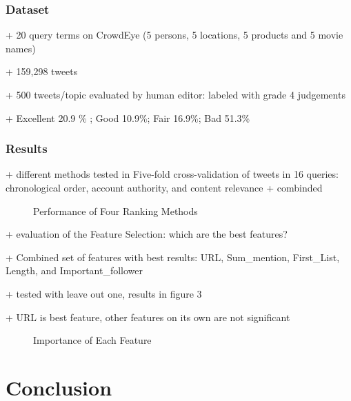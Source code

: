 \documentclass{proseminar}
\begin{document}
\subsubsection*{Dataset}
+ 20 query terms on CrowdEye (5 persons, 5 locations, 5 products and 5 movie names)

+ 159,298 tweets

+ 500 tweets/topic evaluated by human editor: labeled with grade 4 judgements 

+ Excellent 20.9 \% ; Good 10.9\%; Fair 16.9\%; Bad 51.3\% 

\subsubsection*{Results}
+ different methods tested in Five-fold cross-validation of tweets in 16 queries: chronological order, account authority, and content relevance + combinded
\begin{figure}[h]
\centering
{}
\caption{Performance of Four Ranking Methods}
\end{figure}

+ evaluation of the Feature Selection: which are the best features?

+ Combined set of features with best results: URL, Sum\_mention, First\_List, Length, and Important\_follower

+ tested with leave out one, results in figure 3

+ URL is best feature, other features on its own are not significant

\begin{figure}[h]
\centering
{}
\caption{Importance of Each Feature}
\end{figure}




\section{Conclusion}




 

\balancecolumns
\end{document}

